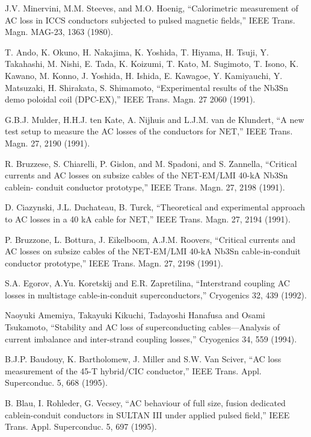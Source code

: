 \noindent [6.27] J.V. Minervini, M.M. Steeves, and M.O. Hoenig, ``Calorimetric measurement of
AC loss in ICCS conductors subjected to pulsed magnetic fields,” IEEE Trans.
Magn. MAG-23, 1363 (1980).

\noindent [6.28] T. Ando, K. Okuno, H. Nakajima, K. Yoshida, T. Hiyama, H. Tsuji, Y. Takahashi,
M. Nishi, E. Tada, K. Koizumi, T. Kato, M. Sugimoto, T. Isono, K. Kawano,
M. Konno, J. Yoshida, H. Ishida, E. Kawagoe, Y. Kamiyauchi, Y. Matsuzaki,
H. Shirakata, S. Shimamoto, ``Experimental results of the Nb3Sn demo poloidal
coil (DPC-EX),” IEEE Trans. Magn. 27 2060 (1991).

\noindent [6.29] G.B.J. Mulder, H.H.J. ten Kate, A. Nijhuis and L.J.M. van de Klundert, ``A new
test setup to measure the AC losses of the conductors for NET,” IEEE Trans.
Magn. 27, 2190 (1991).

\noindent [6.30] R. Bruzzese, S. Chiarelli, P. Gislon, and M. Spadoni, and S. Zannella, ``Critical
currents and AC losses on subsize cables of the NET-EM/LMI 40-kA Nb3Sn cablein-
conduit conductor prototype,” IEEE Trans. Magn. 27, 2198 (1991).

\noindent [6.31] D. Ciazynski, J.L. Duchateau, B. Turck, ``Theoretical and experimental approach
to AC losses in a 40 kA cable for NET,” IEEE Trans. Magn. 27, 2194 (1991).

\noindent [6.32] P. Bruzzone, L. Bottura, J. Eikelboom, A.J.M. Roovers, ``Critical currents and
AC losses on subsize cables of the NET-EM/LMI 40-kA Nb3Sn cable-in-conduit
conductor prototype,” IEEE Trans. Magn. 27, 2198 (1991).

\noindent [6.33] S.A. Egorov, A.Yu. Koretskij and E.R. Zapretilina, ``Interstrand coupling AC losses in multistage cable-in-conduit superconductors,” Cryogenics 32, 439 (1992).

\noindent [6.34] Naoyuki Amemiya, Takayuki Kikuchi, Tadayoshi Hanafusa and Osami Tsukamoto, ``Stability and AC loss of superconducting cables—Analysis of current imbalance and inter-strand coupling losses,” Cryogenics 34, 559 (1994).

\noindent [6.35] B.J.P. Baudouy, K. Bartholomew, J. Miller and S.W. Van Sciver, ``AC loss measurement of the 45-T hybrid/CIC conductor,” IEEE Trans. Appl. Superconduc. 5,
668 (1995).

\noindent [6.36] B. Blau, I. Rohleder, G. Vecsey, ``AC behaviour of full size, fusion dedicated cablein-conduit conductors in SULTAN III under applied pulsed field,” IEEE Trans.
Appl. Superconduc. 5, 697 (1995).

